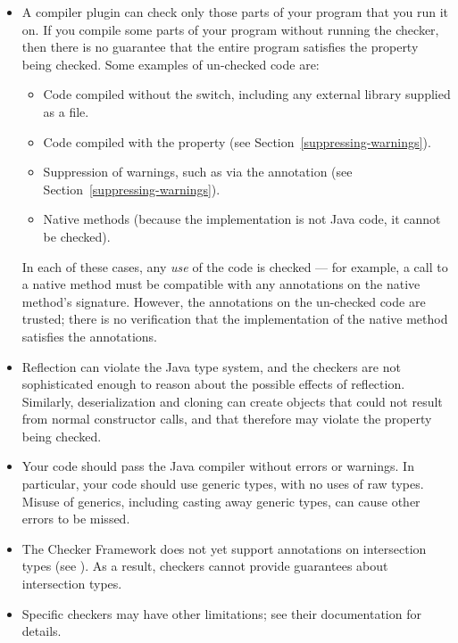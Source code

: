 \begin{itemize}

\item
  A compiler plugin can check only those parts of your program that you run
  it on.  If you compile some parts of your program without running the
  checker, then there is no guarantee that the entire program satisfies the
  property being checked.  Some examples of un-checked code are:

  \begin{itemize}
  \item
    Code compiled without the  switch, including any
    external library supplied as a  file.
  \item
    Code compiled with the  property (see
    Section~\ref{suppressing-warnings}).
  \item
    Suppression of warnings, such as via the 
    annotation (see Section~\ref{suppressing-warnings}).
  \item
    Native methods (because the implementation is not Java code, it cannot
    be checked).
  \end{itemize}

  In each of these cases, any \emph{use} of the code is checked --- for
  example, a call to a native method must be compatible with any
  annotations on the native method's signature.
  However, the annotations on the un-checked code are trusted; there is no
  verification that the implementation of the native method satisfies the
  annotations.

\item
  Reflection can violate the Java type system, and
  the checkers are not sophisticated enough to reason about the possible
  effects of reflection.  Similarly, deserialization and cloning can
  create objects that could not result from normal constructor calls, and
  that therefore may violate the property being checked.

\item
  Your code should pass the Java compiler without errors or warnings.  In
  particular, your code should use generic types, with no uses of raw types.
  Misuse of generics, including casting away generic types, can cause other
  errors to be missed.

\item
  The Checker Framework does not yet support annotations on intersection
  types (see
  ).  As a result, checkers cannot provide guarantees about
  intersection types.

\item
  Specific checkers may have other limitations; see their documentation for
  details.

\end{itemize}

